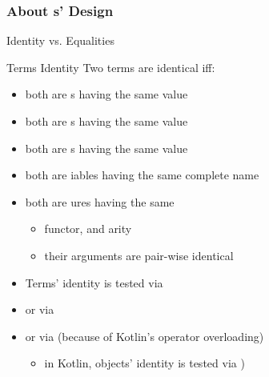 \documentclass[handout]{beamer}
\begin{document}
\subsubsection{About s' Design}

\begin{frame}[allowframebreaks]{Identity vs. Equalities}
    \begin{block}{Terms Identity}
        Two terms are \alert{identical} iff:
        \begin{itemize}
            \item both are s having the same value
            \item both are s having the same value
            \item both are s having the same value
            \item both are iables having the same \alert{complete} name
            \item both are ures having the same
            \begin{itemize}
                \item functor, and arity
                \item their arguments are pair-wise \alert{identical}
            \end{itemize}
        \end{itemize}
    \end{block}
    \begin{itemize}
        \item Terms' \alert{identity} is tested via 
        \item or via 
        \item or via  (because of \alert{Kotlin's operator overloading})
        \begin{itemize}
            \item in Kotlin, objects' identity is tested via )
        \end{itemize}
    \end{itemize}

    \framebreak


\end{frame}
\end{document}
